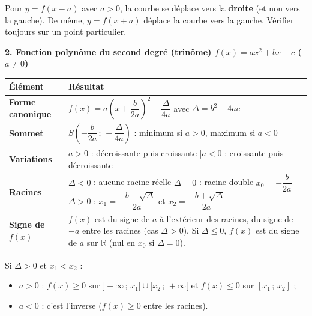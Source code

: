 \documentclass[11pt]{article}
\begin{document}
\begin{attention}
Pour $y=f(x-a)$ avec $a>0$, la courbe se déplace vers la \textbf{droite} (et non vers la gauche). De même, $y=f(x+a)$ déplace la courbe vers la gauche. Vérifier toujours sur un point particulier.
\end{attention}

\textbf{2. Fonction polynôme du second degré (trinôme) $f(x)=ax^2+bx+c$ ($a\neq0$)}\par
\begin{center}
\begin{tabularx}{\linewidth}{|>{\bfseries}l|X|}\hline
\rowcolor{popblueL} \textbf{Élément} & \textbf{Résultat} \\\hline
\textbf{Forme canonique} & $f(x)=a\left(x+\dfrac{b}{2a}\right)^2-\dfrac{\Delta}{4a}$ avec $\Delta=b^2-4ac$ \\\hline
\textbf{Sommet} & $S\left(-\dfrac{b}{2a}\,;\,-\dfrac{\Delta}{4a}\right)$ : minimum si $a>0$, maximum si $a<0$ \\\hline
\textbf{Variations} & $a>0$ : décroissante puis croissante \quad|\quad $a<0$ : croissante puis décroissante \\\hline
\textbf{Racines} & $\Delta<0$ : aucune racine réelle \quad $\Delta=0$ : racine double $x_0=-\dfrac{b}{2a}$ \quad $\Delta>0$ : $x_{1}=\dfrac{-b-\sqrt{\Delta}}{2a}$ et $x_{2}=\dfrac{-b+\sqrt{\Delta}}{2a}$ \\\hline
\textbf{Signe de $f(x)$} & $f(x)$ est du signe de $a$ à l'extérieur des racines, du signe de $-a$ entre les racines (cas $\Delta>0$). Si $\Delta\le 0$, $f(x)$ est du signe de $a$ sur $\mathbb{R}$ (nul en $x_0$ si $\Delta=0$). \\\hline
\end{tabularx}
\end{center}

\begin{aretenir}
Si $\Delta>0$ et $x_1<x_2$ :
\begin{itemize}
  \item $a>0$ : $f(x)\ge 0$ sur $]-\infty\,;\,x_1]\cup[x_2\,;\,+\infty[$ et $f(x)\le 0$ sur $[x_1\,;\,x_2]$ ;
  \item $a<0$ : c'est l'inverse ($f(x)\ge 0$ entre les racines).
\end{itemize}
\end{aretenir}
\end{document}
